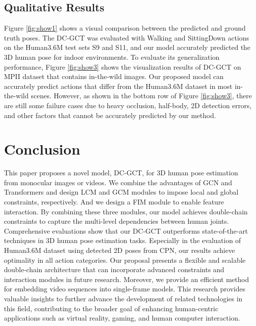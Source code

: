 \documentclass[journal]{IEEEtran}
\begin{document}
\subsection{Qualitative Results}


Figure \ref{fig:show1} shows a visual comparison between the predicted and ground truth poses. The DC-GCT was evaluated with Walking and SittingDown actions on the Human3.6M test sets S9 and S11, and our model accurately predicted the 3D human pose for indoor environments. To evaluate its generalization performance, Figure \ref{fig:show3} shows the visualization results of DC-GCT on MPII \cite{andriluka20142d} dataset that contains in-the-wild images. Our proposed model can accurately predict actions that differ from the Human3.6M dataset in most in-the-wild scenes. However, as shown in the bottom row of Figure \ref{fig:show3}, there are still some failure cases due to heavy occlusion, half-body, 2D detection errors, and other factors that cannot be accurately predicted by our method.













\section{Conclusion}


This paper proposes a novel model, DC-GCT, for 3D human pose estimation from monocular images or videos. We combine the advantages of GCN and Transformers and design LCM and GCM modules to impose local and global constraints, respectively. And we design a FIM module to enable feature interaction. By combining these three modules, our model achieves double-chain constraints to capture the multi-level dependencies between human joints. Comprehensive evaluations show that our DC-GCT outperforms state-of-the-art techniques in 3D human pose estimation tasks. Especially in the evaluation of Human3.6M dataset using detected 2D poses from CPN, our results achieve optimality in all action categories. Our proposal presents a flexible and scalable double-chain architecture that can incorporate advanced constraints and interaction modules in future research. Moreover, we provide an efficient method for embedding video sequences into single-frame models. This research provides valuable insights to further advance the development of related technologies in this field, contributing to the broader goal of enhancing human-centric applications such as virtual reality, gaming, and human computer interaction.



\normalem


  










\vfill
\end{document}
